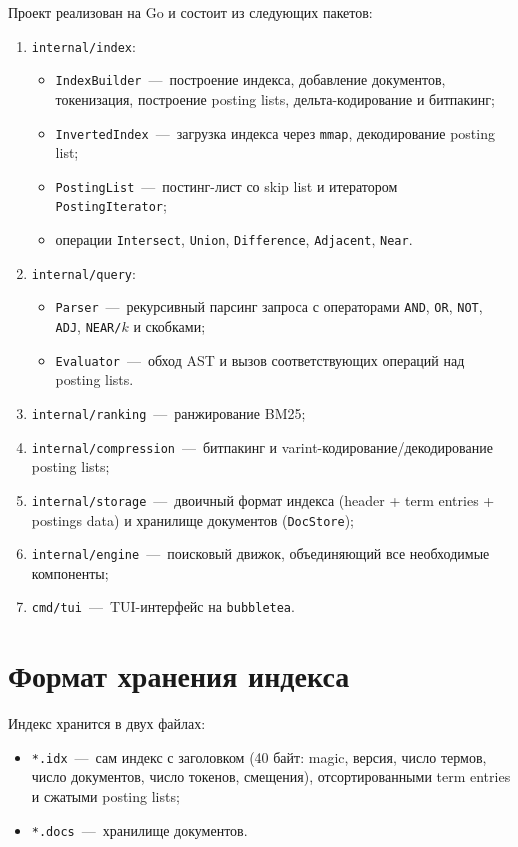 \documentclass{itmo}
\begin{document}
Проект реализован на Go и состоит из следующих пакетов:
\begin{enumerate}
	\item \texttt{internal/index}:
	\begin{itemize}
		\item \texttt{IndexBuilder}~---~построение индекса, добавление документов, токенизация, построение posting lists, дельта-кодирование и битпакинг;
		\item \texttt{InvertedIndex}~---~загрузка индекса через \texttt{mmap}, декодирование posting list;
		\item \texttt{PostingList}~---~постинг-лист со skip list и итератором \texttt{PostingIterator};
		\item операции \texttt{Intersect}, \texttt{Union}, \texttt{Difference}, \texttt{Adjacent}, \texttt{Near}.
	\end{itemize}
	\item \texttt{internal/query}:
	\begin{itemize}
		\item \texttt{Parser}~---~рекурсивный парсинг запроса с операторами \texttt{AND}, \texttt{OR}, \texttt{NOT}, \texttt{ADJ}, \texttt{NEAR/$k$} и скобками;
		\item \texttt{Evaluator}~---~обход AST и вызов соответствующих операций над posting lists.
	\end{itemize}
	\item \texttt{internal/ranking}~---~ранжирование BM25;
	\item \texttt{internal/compression}~---~битпакинг и varint-кодирование/декодирование posting lists;
	\item \texttt{internal/storage}~---~двоичный формат индекса (header + term entries + postings data) и хранилище документов (\texttt{DocStore});
	\item \texttt{internal/engine}~---~поисковый движок, объединяющий все необходимые компоненты;
	\item \texttt{cmd/tui}~---~TUI-интерфейс на \texttt{bubbletea}.
\end{enumerate}

\section{Формат хранения индекса}

Индекс хранится в двух файлах:
\begin{itemize}
	\item \texttt{*.idx}~---~сам индекс с заголовком (40 байт: magic, версия, число термов, число документов, число токенов, смещения), отсортированными term entries и сжатыми posting lists;
	\item \texttt{*.docs}~---~хранилище документов.
\end{itemize}
\end{document}
